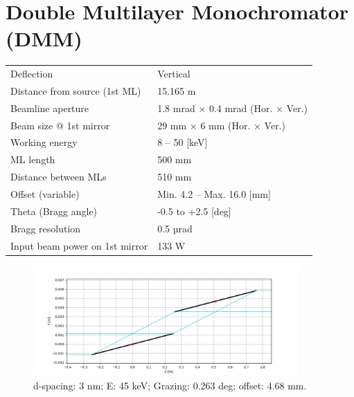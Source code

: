 \section{Double Multilayer Monochromator (DMM)}
\vspace*{-\baselineskip}
\begin{center}
\begin{table} [ht]
\small
\begin{tabular}[bhp]{|p{} | p{}|}
\hline
Deflection & Vertical \\
Distance from source (1st ML) & 15.165 m \\
Beamline aperture & 1.8 mrad × 0.4 mrad (Hor. × Ver.) \\
Beam size @ 1st mirror & 29 mm × 6 mm (Hor. × Ver.) \\
Working energy & 8 – 50 [keV] \\
ML length & 500 mm \\
Distance between MLs & 510 mm \\
Offset (variable) & Min. 4.2 – Max. 16.0 [mm] \\
Theta (Bragg angle) & -0.5 to +2.5 [deg] \\
Bragg resolution & 0.5 µrad \\
Input beam power on 1st mirror & 133 W \\
\hline
\end{tabular}
\label{tab:DMM_general}
\end{table}
\end{center}

\setlength{\belowcaptionskip}{-15pt}
\vspace*{-\baselineskip}

\begin{figure} [!ht]
\centering
\includegraphics[width=0.9\textwidth]{./../figures/operation/DMM_mirrors_d3_E45_gr0.263_offset4.68.png}
\caption{\label{fig:DMM_mirrors_45keV} d-spacing: 3 nm; E: 45 keV; Grazing: 0.263 deg; offset: 4.68 mm.}
\end{figure}

